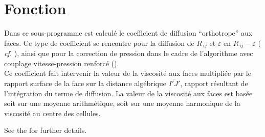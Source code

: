 
%
%
%
%


%

\hypertarget{visort}{}

\vspace{1cm}
\section*{Fonction}
Dans ce sous-programme est calcul\'e le coefficient de diffusion ``orthotrope'' aux faces. Ce type de coefficient se rencontre pour la diffusion de $R_{\,ij}$ et
$\varepsilon$ en $R_{\,ij}-\varepsilon$ ( {\it cf.} ), ainsi que pour la
correction de pression dans le cadre de l'algorithme avec couplage
vitesse-pression renforcé ().\\
Ce coefficient fait intervenir la valeur de la viscosité aux faces multipliée par
le rapport surface de la face sur la distance alg\'ebrique $\overline{I'J'}$,
rapport résultant de l'intégration du terme de diffusion.
La valeur de la viscosité aux faces est basée soit sur une moyenne
arithmétique, soit sur une moyenne harmonique de la viscosité au centre des
cellules.

See the  for further details.

